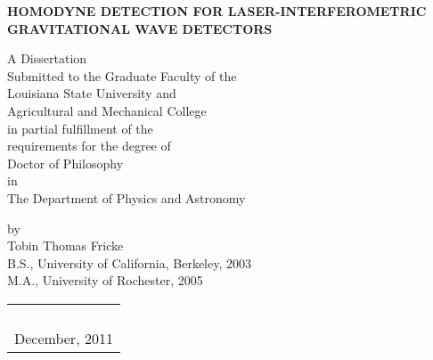 \thispagestyle{empty}
\begin{center}
\textbf{HOMODYNE DETECTION FOR LASER-INTERFEROMETRIC GRAVITATIONAL WAVE DETECTORS}
\vspace{1.75in}

A Dissertation\\
\vspace{1ex}
Submitted to the Graduate Faculty of the\\
Louisiana State University and\\
Agricultural and Mechanical College\\
in partial fulfillment of the\\
requirements for the degree of\\
Doctor of Philosophy\\
\vspace{1ex}
in\\
\vspace{1ex}
The Department of Physics and Astronomy\\
\vspace{1in}
\vspace{0.75in}

by\\
Tobin Thomas Fricke \\
B.S., University of California, Berkeley, 2003\\
M.A., University of Rochester, 2005 \\

\begin{tabular}{c}
\\
\\
\\
\\
\\
December, 2011
\end{tabular}

\end{center}

